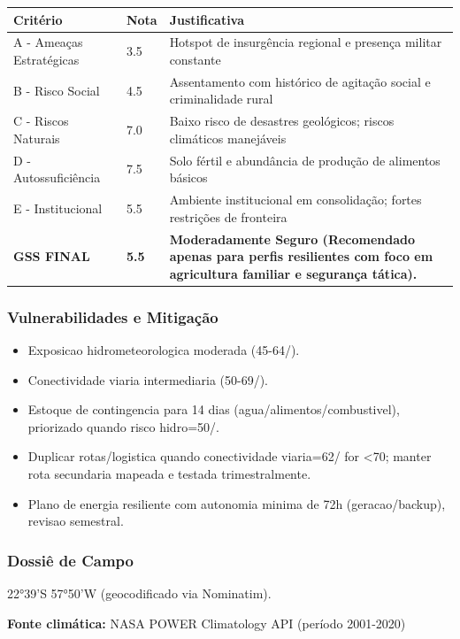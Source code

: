 \begin{table}[ht!]
\small \begin{tabular}{p{3.0cm}p{0.8cm}p{6.0cm}} \toprule
\textbf{Critério} & \textbf{Nota} & \textbf{Justificativa} \\ \midrule
A - Ameaças Estratégicas & 3.5 & Hotspot de insurgência regional e presença militar constante \\
B - Risco Social & 4.5 & Assentamento com histórico de agitação social e criminalidade rural \\
C - Riscos Naturais & 7.0 & Baixo risco de desastres geológicos; riscos climáticos manejáveis \\
D - Autossuficiência & 7.5 & Solo fértil e abundância de produção de alimentos básicos \\
E - Institucional & 5.5 & Ambiente institucional em consolidação; fortes restrições de fronteira \\
\midrule \textbf{GSS FINAL} & \textbf{5.5} & \textbf{Moderadamente Seguro (Recomendado apenas para perfis resilientes com foco em agricultura familiar e segurança tática).} \\ \bottomrule \end{tabular}
\end{table}
\subsubsection{Vulnerabilidades e
Mitigação}

\begin{itemize}
\tightlist
\item
  Exposicao hidrometeorologica moderada (45-64/\allowbreak {}).
\item
  Conectividade viaria intermediaria (50-69/\allowbreak {}).
\item
  Estoque de contingencia para 14 dias (agua/\allowbreak \allowbreak alimentos/\allowbreak \allowbreak combustivel),
  priorizado quando risco hidro=50/\allowbreak {}.
\item
  Duplicar rotas/\allowbreak \allowbreak logistica quando conectividade viaria=62/\allowbreak {} for
  \textless70; manter rota secundaria mapeada e testada trimestralmente.
\item
  Plano de energia resiliente com autonomia minima de 72h
  (geracao/\allowbreak \allowbreak backup), revisao semestral.
\end{itemize}

\subsubsection{Dossiê de Campo}
\begin{description}[style=nextline,leftmargin=0.5cm,font=\bfseries]
\item[Coordenadas]  22°39'S 57°50'W (geocodificado via Nominatim).
\end{description}
\textbf{Fonte climática:} NASA POWER Climatology API (período 2001-2020)

